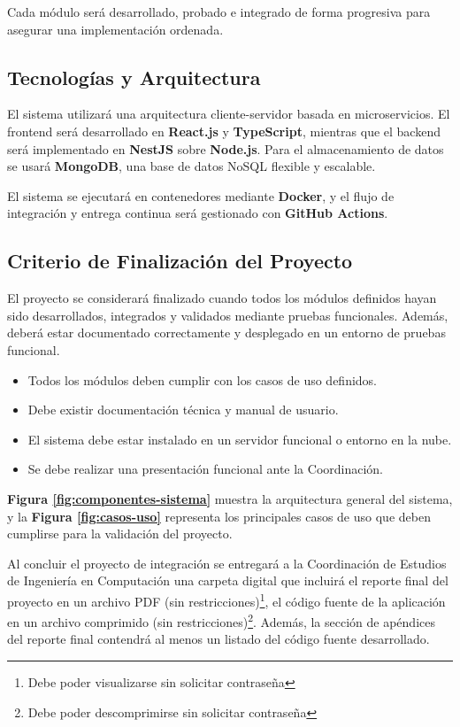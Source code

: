 Cada módulo será desarrollado, probado e integrado de forma progresiva para asegurar una implementación ordenada.

\subsection{Tecnologías y Arquitectura}

El sistema utilizará una arquitectura cliente-servidor basada en microservicios. El frontend será desarrollado en \textbf{React.js} y \textbf{TypeScript}, mientras que el backend será implementado en \textbf{NestJS} sobre \textbf{Node.js}. Para el almacenamiento de datos se usará \textbf{MongoDB}, una base de datos NoSQL flexible y escalable.

El sistema se ejecutará en contenedores mediante \textbf{Docker}, y el flujo de integración y entrega continua será gestionado con \textbf{GitHub Actions}.

\subsection{Criterio de Finalización del Proyecto}

El proyecto se considerará finalizado cuando todos los módulos definidos hayan sido desarrollados, integrados y validados mediante pruebas funcionales. Además, deberá estar documentado correctamente y desplegado en un entorno de pruebas funcional.

\begin{itemize}
	\item Todos los módulos deben cumplir con los casos de uso definidos.
	\item Debe existir documentación técnica y manual de usuario.
	\item El sistema debe estar instalado en un servidor funcional o entorno en la nube.
	\item Se debe realizar una presentación funcional ante la Coordinación.
\end{itemize}

\textbf{Figura \ref{fig:componentes-sistema}} muestra la arquitectura general del sistema, y la \textbf{Figura \ref{fig:casos-uso}} representa los principales casos de uso que deben cumplirse para la validación del proyecto.

\vspace{0.5cm}

Al concluir el proyecto de integración se entregará a la Coordinación de Estudios de Ingeniería en Computación una carpeta digital que incluirá el reporte final del proyecto en un archivo PDF (sin restricciones)\footnote{Debe poder visualizarse sin solicitar contraseña}, el código fuente de la aplicación en un archivo comprimido (sin restricciones)\footnote{Debe poder descomprimirse sin solicitar contraseña}. Además, la sección de apéndices del reporte final contendrá al menos un listado del código fuente desarrollado.

